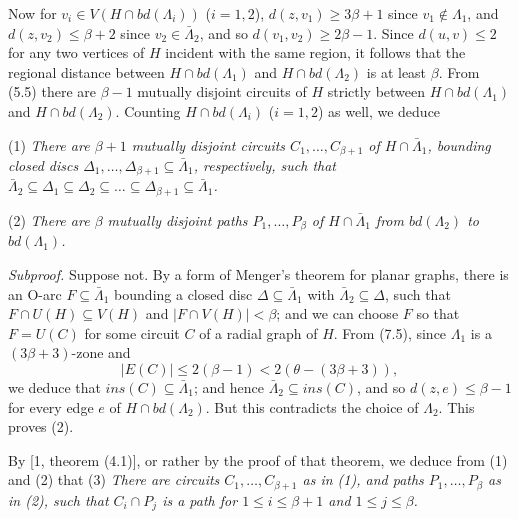 Now for $v_i \in V(H \cap bd(\Lambda_i))$ ($i = 1, 2$), $d(z, v_1) \ge 3\beta + 1$ since $v_1 \notin \Lambda_1$, and $d(z, v_2) \le \beta + 2$ since $v_2 \in \bar{\Lambda}_2$, and so $d(v_1, v_2) \ge 2\beta - 1$. Since $d(u, v) \le 2$ for any two vertices of $H$ incident with the same region, it follows that the regional distance between $H \cap bd(\Lambda_1)$ and $H \cap bd(\Lambda_2)$ is at least $\beta$. From (5.5) there are $\beta - 1$ mutually disjoint circuits of $H$ strictly between $H \cap bd(\Lambda_1)$ and $H \cap bd(\Lambda_2)$. Counting $H \cap bd(\Lambda_i)$ ($i = 1, 2$) as well, we deduce

\hspace*{12pt}(1) \textit{There are $\beta + 1$ mutually disjoint circuits $C_1, \dots, C_{\beta + 1}$ of $H \cap \bar{\Lambda}_1$, bounding closed discs $\Delta_1, \dots, \Delta_{\beta + 1} \subseteq \bar{\Lambda}_1$, respectively, such that $\bar{\Lambda}_2 \subseteq \Delta_1 \subseteq \Delta_2 \subseteq \dots \subseteq \Delta_{\beta + 1} \subseteq \bar{\Lambda}_1$.}

\hspace*{12pt}(2) \textit{There are $\beta$ mutually disjoint paths $P_1, \dots, P_\beta$ of $H \cap \bar{\Lambda}_1$ from $bd(\Lambda_2)$ to $bd(\Lambda_1)$.}

\textit{Subproof.} Suppose not. By a form of Menger's theorem for planar graphs, there is an O-arc $F \subseteq \bar{\Lambda}_1$ bounding a closed disc $\Delta \subseteq \bar{\Lambda}_1$ with $\bar{\Lambda}_2 \subseteq \Delta$, such that $F \cap U(H) \subseteq V(H)$ and $|F \cap V(H)| < \beta$; and we can choose $F$ so that $F = U(C)$ for some circuit $C$ of a radial graph of $H$. From (7.5), since $\Lambda_1$ is a $(3\beta + 3)$-zone and
\begin{equation*}
|E(C)| \le 2(\beta - 1) < 2(\theta - (3\beta + 3)),
\end{equation*}
we deduce that $ins(C) \subseteq \bar{\Lambda}_1$; and hence $\bar{\Lambda}_2 \subseteq ins(C)$, and so $d(z, e) \le \beta - 1$ for every edge $e$ of $H \cap bd(\Lambda_2)$. But this contradicts the choice of $\Lambda_2$. This proves (2).

By [1, theorem (4.1)], or rather by the proof of that theorem, we deduce from (1) and (2) that (3) \textit{There are circuits $C_1, \dots, C_{\beta + 1}$ as in (1), and paths $P_1, \dots, P_\beta$ as in (2), such that $C_i \cap P_j$ is a path for $1 \le i \le \beta + 1$ and $1 \le j \le \beta$.}


